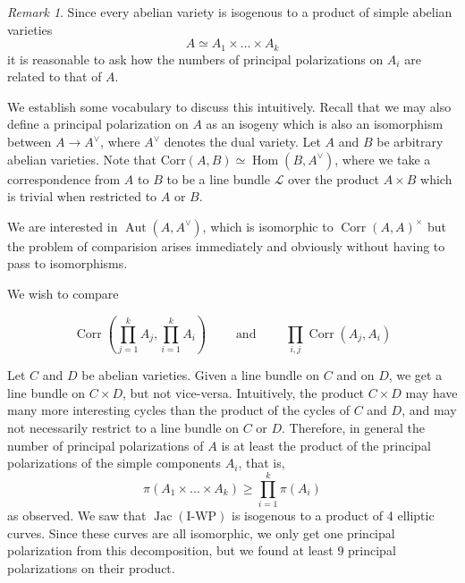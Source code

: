 \documentclass[12pt,reqno]{amsart}
\DeclareMathOperator{\Aut}{Aut}
\DeclareMathOperator{\Hom}{Hom}
\DeclareMathOperator{\Jac}{Jac}
\DeclareMathOperator{\Corr}{Corr}
\theoremstyle{definition}
\theoremstyle{remark}
\newtheorem*{remark}{Remark}
\newcommand{\ti}{\todo[inline]}
\begin{document}
\begin{remark} Since every abelian variety is isogenous to a product of simple abelian varieties $$A \simeq A_1 \times ... \times A_k$$ it is reasonable to ask how the numbers of principal polarizations on $A_i$ are related to that of $A$. 

We establish some vocabulary to discuss this intuitively. Recall that we may also define a principal polarization on $A$ as an isogeny which is also an isomorphism between $A \to A^\vee$, where $A^\vee$ denotes the dual variety. Let $A$ and $B$ be arbitrary abelian varieties. Note that $\text{Corr}(A, B) \simeq \Hom(B, A^\vee)$, where we take a correspondence from $A$ to $B$ to be a line bundle $\mathcal{L}$ over the product $A \times B$ which is trivial when restricted to $A$ or $B$.

We are interested in $\Aut(A, A^\vee)$, which is isomorphic to $\Corr(A, A)^\times$ but the problem of comparision arises immediately and obviously without having to pass to isomorphisms. %

We wish to compare

$$\Corr\left(\prod_{j= 1}^k A_j, \prod_{i= 1}^k A_i\right) \qquad \text{ and  } \qquad \prod_{i, j} \Corr(A_j, A_i)$$

Let $C$ and $D$ be abelian varieties. Given a line bundle on $C$ and on $D$, we get a line bundle on $C \times D$, but not vice-versa. Intuitively, the product $C \times D$ may have many more interesting cycles than the product of the cycles of $C$ and $D$, and may not necessarily restrict to a line bundle on $C$ or $D$. Therefore, in general the number of principal polarizations of $A$ is at least the product of the principal polarizations of the simple components $A_i$, that is, $$\pi(A_1 \times ... \times A_k) \geq \prod_{i=1}^k \pi(A_i)$$ as observed. We saw that $\Jac(\text{I-WP})$ is isogenous to a product of 4 elliptic curves. Since these curves are all isomorphic, we only get one principal polarization from this decomposition, but we found at least 9 principal polarizations on their product.
\end{remark} 



\end{document}
